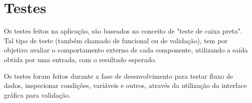\section{Testes}

Os testes feitos na aplicação, são baseados no conceito de "teste de caixa preta". Tal tipo de teste (também chamado de funcional ou de validação), tem por objetivo avaliar o comportamento externo de cada componente, utilizando a saída obtida por uma entrada, com o resultado esperado.

Os testes foram feitos durante a fase de desenvolvimento para testar fluxo de dados, inspecionar condições, variáveis e outros, através da utilização da interface gráfica para validação.

